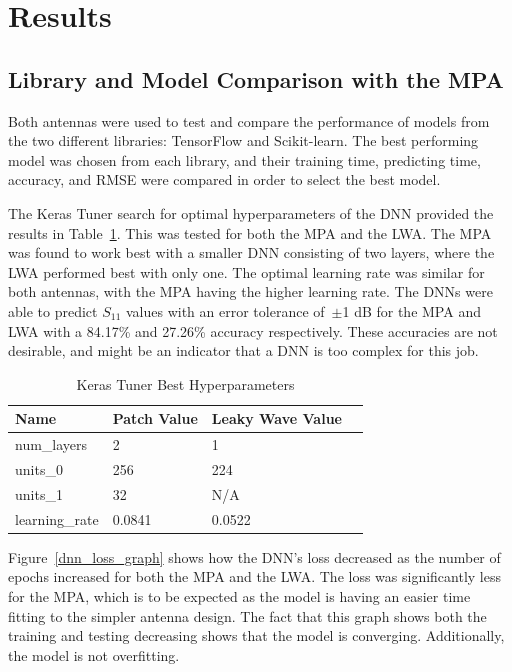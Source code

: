 \documentclass[conference]{IEEEtran}
\begin{document}
\section{Results}
\subsection{Library and Model Comparison with the MPA}
Both antennas were used to test and compare the performance of models from the two different libraries: TensorFlow and Scikit-learn. The best performing model was chosen from each library, and their training time, predicting time, accuracy, and RMSE were compared in order to select the best model.

The Keras Tuner search for optimal hyperparameters of the DNN provided the results in Table~\ref{keras_best_params}. This was tested for both the MPA and the LWA. The MPA was found to work best with a smaller DNN consisting of two layers, where the LWA performed best with only one. The optimal learning rate was similar for both antennas, with the MPA having the higher learning rate. The DNNs were able to predict $S_{11}$ values with an error tolerance of~$\pm$1 dB for the MPA and LWA with a 84.17\% and 27.26\% accuracy respectively. These accuracies are not desirable, and might be an indicator that a DNN is too complex for this job.

\begin{table}[h]
\caption{Keras Tuner Best Hyperparameters}
\begin{center}
\begin{tabular}{ |l|l|l|l| }
    \hline
    Name & Patch Value & Leaky Wave Value \\ 
    \hline
    num\_layers & 2 & 1 \\  
    \hline
    units\_0 & 256 & 224 \\
    \hline
    units\_1 & 32 & N/A \\
    \hline
    learning\_rate & 0.0841 & 0.0522 \\
    \hline
\end{tabular}
\end{center}
\label{keras_best_params}
\end{table}

Figure~\ref{dnn_loss_graph} shows how the DNN's loss decreased as the number of epochs increased for both the MPA and the LWA. The loss was significantly less for the MPA, which is to be expected as the model is having an easier time fitting to the simpler antenna design. The fact that this graph shows both the training and testing decreasing shows that the model is converging. Additionally, the model is not overfitting. 
\end{document}
